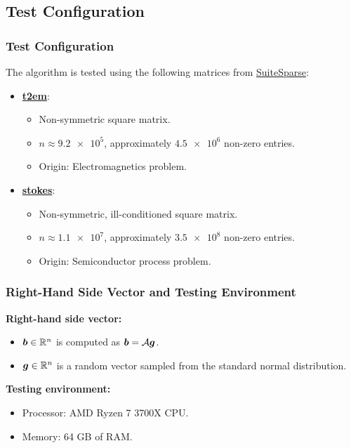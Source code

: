 \subsection{Test Configuration}

\begin{frame}
    \frametitle{Test Configuration}

    The algorithm is tested using the following matrices from \href{https://sparse.tamu.edu}{SuiteSparse}:

    \begin{itemize}
        \item \textbf{\href{https://sparse.tamu.edu/CEMW/t2em}{t2em}}: 
        \begin{itemize}
            \item Non-symmetric square matrix.
            \item $n \approx \num{9.2e5}$, approximately $\num{4.5e6}$ non-zero entries.
            \item Origin: Electromagnetics problem.
        \end{itemize}
        \item \textbf{\href{https://sparse.tamu.edu/VLSI/stokes}{stokes}}: 
        \begin{itemize}
            \item Non-symmetric, ill-conditioned square matrix.
            \item $n \approx \num{1.1e7}$, approximately $\num{3.5e8}$ non-zero entries.
            \item Origin: Semiconductor process problem.
        \end{itemize}
    \end{itemize}

\end{frame}

\begin{frame}
    \frametitle{Right-Hand Side Vector and Testing Environment}

    \textbf{Right-hand side vector:}
    \begin{itemize}
        \item $\bm{b} \in \mathbb{R}^{n}$ is computed as $\bm{b} = \mathcal{A} \bm{g}$.
        \item $\bm{g} \in \mathbb{R}^{n}$ is a random vector sampled from the standard normal distribution.
    \end{itemize}

    \textbf{Testing environment:}
    \begin{itemize}
        \item Processor: AMD Ryzen 7 3700X CPU.
        \item Memory: 64 GB of RAM.
    \end{itemize}

\end{frame}

